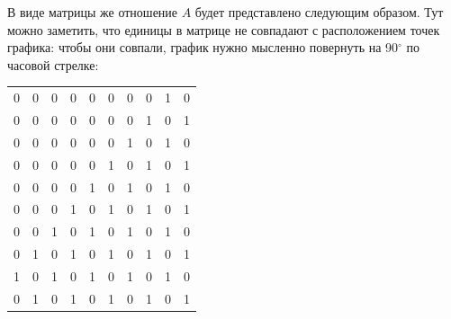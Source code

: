 \documentclass[12pt]{article}
\begin{document}
	
	В виде матрицы же отношение $A$ будет представлено следующим образом. Тут можно заметить, что единицы в матрице не совпадают с расположением точек графика: чтобы они совпали, график нужно мысленно повернуть на 90$^{\circ}$ по часовой стрелке:
	
	\begin{tabular} {c c c c c c c c c c}
		0 & 0 & 0 & 0 & 0 & 0 & 0 & 0 & 1 & 0 \\
		0 & 0 & 0 & 0 & 0 & 0 & 0 & 1 & 0 & 1 \\
		0 & 0 & 0 & 0 & 0 & 0 & 1 & 0 & 1 & 0 \\
		0 & 0 & 0 & 0 & 0 & 1 & 0 & 1 & 0 & 1 \\
		0 & 0 & 0 & 0 & 1 & 0 & 1 & 0 & 1 & 0 \\
		0 & 0 & 0 & 1 & 0 & 1 & 0 & 1 & 0 & 1 \\
		0 & 0 & 1 & 0 & 1 & 0 & 1 & 0 & 1 & 0 \\
		0 & 1 & 0 & 1 & 0 & 1 & 0 & 1 & 0 & 1 \\
		1 & 0 & 1 & 0 & 1 & 0 & 1 & 0 & 1 & 0 \\
		0 & 1 & 0 & 1 & 0 & 1 & 0 & 1 & 0 & 1 \\
	\end{tabular}
	
\end{document}
